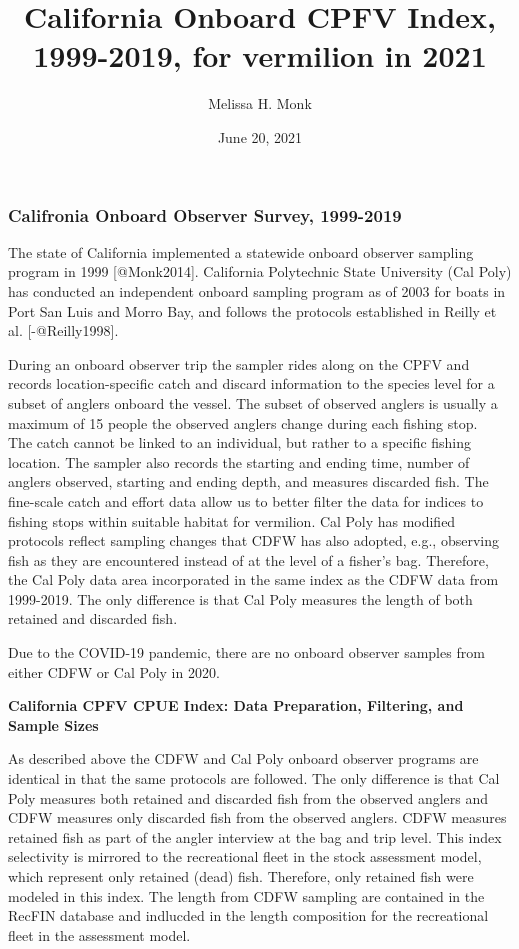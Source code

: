 \documentclass[
]{article}
\title{California Onboard CPFV Index, 1999-2019, for vermilion in 2021}
\author{Melissa H. Monk}
\date{June 20, 2021}
\begin{document}
\maketitle

{
\setcounter{tocdepth}{2}
\tableofcontents
}
\hypertarget{califronia-onboard-observer-survey-1999-2019}{%
\subsubsection{Califronia Onboard Observer Survey, 1999-2019}\label{califronia-onboard-observer-survey-1999-2019}}

The state of California implemented a statewide onboard observer sampling
program in 1999 {[}@Monk2014{]}. California Polytechnic State University (Cal
Poly) has conducted an independent onboard sampling
program as of 2003 for boats in Port San Luis and Morro Bay, and follows
the protocols established in Reilly et al. {[}-@Reilly1998{]}.

During an onboard observer trip the sampler rides along on the CPFV and records
location-specific catch and discard information to the species level for a subset
of anglers onboard the vessel. The subset of observed anglers is usually a
maximum of 15 people the observed anglers change during each fishing stop.\\
The catch cannot be linked to an individual, but rather
to a specific fishing location. The sampler also records the starting and
ending time, number of anglers observed, starting and ending depth, and measures
discarded fish. The fine-scale catch and effort data allow us to better filter
the data for indices to fishing stops within suitable habitat for vermilion.
Cal Poly has modified protocols reflect sampling changes that CDFW
has also adopted, e.g., observing fish as they are encountered instead of at
the level of a fisher's bag. Therefore, the Cal Poly data area incorporated in
the same index as the CDFW data from 1999-2019. The only difference is that
Cal Poly measures the length of both retained and discarded fish.

Due to the COVID-19 pandemic, there are no onboard observer samples from either
CDFW or Cal Poly in 2020.

\textbf{California CPFV CPUE Index: Data Preparation, Filtering, and Sample Sizes}

As described above the CDFW and Cal Poly onboard observer programs are identical
in that the same protocols are followed. The only difference is that Cal Poly
measures both retained and discarded fish from the observed anglers and CDFW
measures only discarded fish from the observed anglers. CDFW measures retained
fish as part of the angler interview at the bag and trip level. This index
selectivity is mirrored to the recreational
fleet in the stock assessment model, which represent only retained (dead)
fish. Therefore, only retained fish were modeled in this index. The length
from CDFW sampling are contained in the RecFIN database and indlucded in the
length composition for the recreational fleet in the assessment model.
\end{document}
